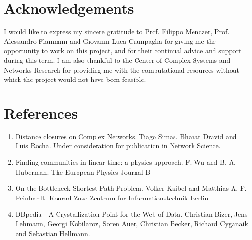 \documentclass[12pt]{article}
\begin{document}
\section{Acknowledgements}
I would like to express my sincere gratitude to Prof. Filippo Menczer, Prof. Alessandro Flammini and Giovanni Luca Ciampaglia for giving me the opportunity to work on this project, and for their continual advice and support during this term. I am also thankful to the Center of Complex Systems and Networks Research for providing me with the computational resources without which the project would not have been feasible.

\section{References}
\begin{enumerate}
\item Distance closures on Complex Networks. Tiago Simas, Bharat Dravid and Luis Rocha. Under consideration for publication in Network Science.
\item Finding communities in linear time: a physics approach. F. Wu and B. A. Huberman. The European Physics Journal B
\item On the Bottleneck Shortest Path Problem. Volker Kaibel and Matthias A. F. Peinhardt. Konrad-Zuse-Zentrum fur Informationstechnik Berlin
\item DBpedia - A Crystallization Point for the Web of Data. Christian Bizer, Jens Lehmann, Georgi Kobilarov, Soren Auer, Christian Becker, Richard Cyganaik and Sebastian Hellmann.
\end{enumerate}
\end{document}
